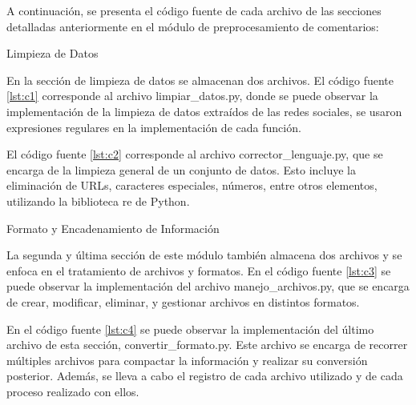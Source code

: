 A continuación, se presenta el código fuente de cada archivo de las secciones detalladas anteriormente en el módulo de preprocesamiento de comentarios:

Limpieza de Datos

En la sección de limpieza de datos se almacenan dos archivos. El código fuente \ref{lst:c1} corresponde al archivo limpiar\_datos.py, donde se puede observar la implementación de la limpieza de datos extraídos de las redes sociales, se usaron expresiones regulares en la implementación de cada función. 





El código fuente \ref{lst:c2} corresponde al archivo corrector\_lenguaje.py, que se encarga de la limpieza general de un conjunto de datos. Esto incluye la eliminación de URLs, caracteres especiales, números, entre otros elementos, utilizando la biblioteca re de Python.



Formato y Encadenamiento de Información

La segunda y última sección de este módulo también almacena dos archivos y se enfoca en el tratamiento de archivos y formatos. En el código fuente \ref{lst:c3} se puede observar la implementación del archivo manejo\_archivos.py, que se encarga de crear, modificar, eliminar, y gestionar archivos en distintos formatos.



En el código fuente \ref{lst:c4} se puede observar la implementación del último archivo de esta sección, convertir\_formato.py. Este archivo se encarga de recorrer múltiples archivos para compactar la información y realizar su conversión posterior. Además, se lleva a cabo el registro de cada archivo utilizado y de cada proceso realizado con ellos.



